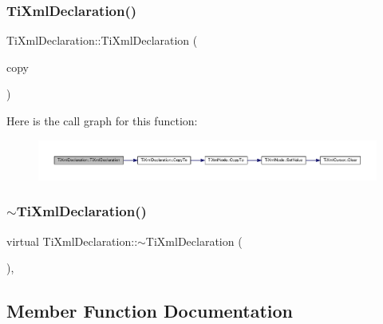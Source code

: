 \subsubsection{\texorpdfstring{Ti\+Xml\+Declaration()}{TiXmlDeclaration()}\hspace{0.1cm}{\footnotesize\ttfamily [3/3]}}
{\footnotesize\ttfamily Ti\+Xml\+Declaration\+::\+Ti\+Xml\+Declaration (\begin{DoxyParamCaption}\item[{const \hyperlink{class_ti_xml_declaration}{Ti\+Xml\+Declaration} \&}]{copy }\end{DoxyParamCaption})}

Here is the call graph for this function\+:
\nopagebreak
\begin{figure}[H]
\begin{center}
\leavevmode
\includegraphics[width=350pt]{class_ti_xml_declaration_a58ac9042c342f7845c8491da0bb091e8_cgraph}
\end{center}
\end{figure}
\mbox{\label{class_ti_xml_declaration_ad5f37a673f4c507fd7e550470f9cec25}} 
\subsubsection{\texorpdfstring{$\sim$\+Ti\+Xml\+Declaration()}{~TiXmlDeclaration()}}
{\footnotesize\ttfamily virtual Ti\+Xml\+Declaration\+::$\sim$\+Ti\+Xml\+Declaration (\begin{DoxyParamCaption}{ }\end{DoxyParamCaption})\hspace{0.3cm}{\ttfamily [inline]}, {\ttfamily [virtual]}}



\subsection{Member Function Documentation}
\mbox{\label{class_ti_xml_declaration_aa1b6bade6c989407ce9881bdfc73c1e6}} 
